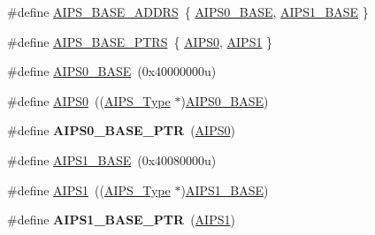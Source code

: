 \begin{DoxyCompactItemize}
\item 
\#define \hyperlink{group__AIPS__Peripheral__Access__Layer_ga8aa4e4d4ece25fca4cf74a31f58951ec}{A\+I\+P\+S\+\_\+\+B\+A\+S\+E\+\_\+\+A\+D\+D\+RS}~\{ \hyperlink{group__AIPS__Peripheral__Access__Layer_ga0162f7b0dfde801ad0aec6b77bf9d568}{A\+I\+P\+S0\+\_\+\+B\+A\+SE}, \hyperlink{group__AIPS__Peripheral__Access__Layer_gaffd389fb1382348a01812983d3f719eb}{A\+I\+P\+S1\+\_\+\+B\+A\+SE} \}
\item 
\#define \hyperlink{group__AIPS__Peripheral__Access__Layer_gacdda032ccd174e1d8c1a02b1e0f7a441}{A\+I\+P\+S\+\_\+\+B\+A\+S\+E\+\_\+\+P\+T\+RS}~\{ \hyperlink{group__AIPS__Peripheral__Access__Layer_gadd0f01794c41f63593cc12e3e6005a95}{A\+I\+P\+S0}, \hyperlink{group__AIPS__Peripheral__Access__Layer_gaf3762b87e8cec88184bb576217fbcee8}{A\+I\+P\+S1} \}
\item 
\#define \hyperlink{group__AIPS__Peripheral__Access__Layer_ga0162f7b0dfde801ad0aec6b77bf9d568}{A\+I\+P\+S0\+\_\+\+B\+A\+SE}~(0x40000000u)
\item 
\#define \hyperlink{group__AIPS__Peripheral__Access__Layer_gadd0f01794c41f63593cc12e3e6005a95}{A\+I\+P\+S0}~((\hyperlink{structAIPS__Type}{A\+I\+P\+S\+\_\+\+Type} $\ast$)\hyperlink{group__AIPS__Peripheral__Access__Layer_ga0162f7b0dfde801ad0aec6b77bf9d568}{A\+I\+P\+S0\+\_\+\+B\+A\+SE})
\item 
\#define {\bfseries A\+I\+P\+S0\+\_\+\+B\+A\+S\+E\+\_\+\+P\+TR}~(\hyperlink{group__AIPS__Peripheral__Access__Layer_gadd0f01794c41f63593cc12e3e6005a95}{A\+I\+P\+S0})\hypertarget{group__AIPS__Peripheral__Access__Layer_ga6affb22d1dff0d01c843913f33f1c1a9}{}\label{group__AIPS__Peripheral__Access__Layer_ga6affb22d1dff0d01c843913f33f1c1a9}

\item 
\#define \hyperlink{group__AIPS__Peripheral__Access__Layer_gaffd389fb1382348a01812983d3f719eb}{A\+I\+P\+S1\+\_\+\+B\+A\+SE}~(0x40080000u)
\item 
\#define \hyperlink{group__AIPS__Peripheral__Access__Layer_gaf3762b87e8cec88184bb576217fbcee8}{A\+I\+P\+S1}~((\hyperlink{structAIPS__Type}{A\+I\+P\+S\+\_\+\+Type} $\ast$)\hyperlink{group__AIPS__Peripheral__Access__Layer_gaffd389fb1382348a01812983d3f719eb}{A\+I\+P\+S1\+\_\+\+B\+A\+SE})
\item 
\#define {\bfseries A\+I\+P\+S1\+\_\+\+B\+A\+S\+E\+\_\+\+P\+TR}~(\hyperlink{group__AIPS__Peripheral__Access__Layer_gaf3762b87e8cec88184bb576217fbcee8}{A\+I\+P\+S1})\hypertarget{group__AIPS__Peripheral__Access__Layer_gab38278851053aa66f9683ed8707e23bc}{}\label{group__AIPS__Peripheral__Access__Layer_gab38278851053aa66f9683ed8707e23bc}


\end{DoxyCompactItemize}
